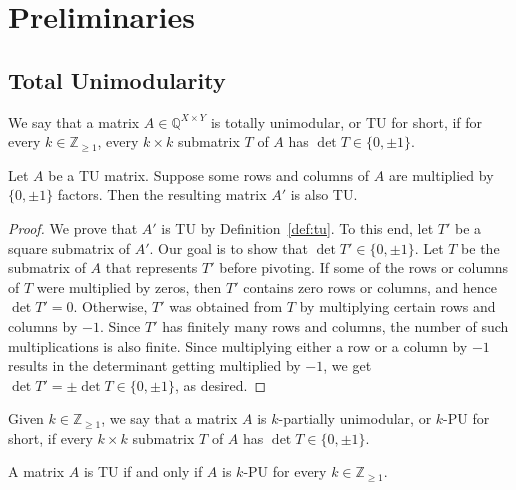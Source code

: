 \chapter{Preliminaries}

\section{Total Unimodularity}

\begin{definition}\label{def:tu}
    We say that a matrix $A \in \mathbb{Q}^{X \times Y}$ is totally unimodular, or TU for short, if for every $k \in \mathbb{Z}_{\geq 1}$, every $k \times k$ submatrix $T$ of $A$ has $\det T \in \{0, \pm 1\}$.
\end{definition}

\begin{lemma}\label{lem:tu_mul_row_col_pnz}
    Let $A$ be a TU matrix. Suppose some rows and columns of $A$ are multiplied by $\{0, \pm 1\}$ factors. Then the resulting matrix $A'$ is also TU.
\end{lemma}

\begin{proof}
    We prove that $A'$ is TU by Definition~\ref{def:tu}. To this end, let $T'$ be a square submatrix of $A'$. Our goal is to show that $\det T' \in \{0, \pm 1\}$. Let $T$ be the submatrix of $A$ that represents $T'$ before pivoting. If some of the rows or columns of $T$ were multiplied by zeros, then $T'$ contains zero rows or columns, and hence $\det T' = 0$. Otherwise, $T'$ was obtained from $T$ by multiplying certain rows and columns by $-1$. Since $T'$ has finitely many rows and columns, the number of such multiplications is also finite. Since multiplying either a row or a column by $-1$ results in the determinant getting multiplied by $-1$, we get $\det T' = \pm \det T \in \{0, \pm 1\}$, as desired.
\end{proof}

\begin{definition}\label{def:pu}
    Given $k \in \mathbb{Z}_{\geq 1}$, we say that a matrix $A$ is $k$-partially unimodular, or $k$-PU for short, if every $k \times k$ submatrix $T$ of $A$ has $\det T \in \{0, \pm 1\}$.
\end{definition}

\begin{lemma}\label{lem:tu_iff_all_pu}
    A matrix $A$ is TU if and only if $A$ is $k$-PU for every $k \in \mathbb{Z}_{\geq 1}$.
\end{lemma}

